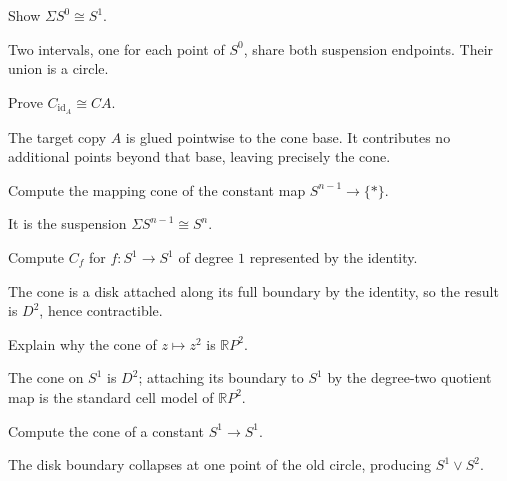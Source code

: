 \begin{problem}[Suspension of \(S^0\)]\label{prob:viii07-03}
Show \(\Sigma S^0\cong S^1\).
\end{problem}
\begin{solution}
Two intervals, one for each point of \(S^0\), share both suspension endpoints.  Their union is a circle.
\end{solution}

\begin{problem}\label{prob:viii07-04}
Prove \(C_{\operatorname{id}_A}\cong CA\).
\end{problem}
\begin{solution}
The target copy \(A\) is glued pointwise to the cone base.  It contributes no additional points beyond that base, leaving precisely the cone.
\end{solution}

\begin{problem}\label{prob:viii07-05}
Compute the mapping cone of the constant map \(S^{n-1}\to\{*\}\).
\end{problem}
\begin{solution}
It is the suspension \(\Sigma S^{n-1}\cong S^n\).
\end{solution}

\begin{problem}\label{prob:viii07-06}
Compute \(C_f\) for \(f:S^1\to S^1\) of degree \(1\) represented by the identity.
\end{problem}
\begin{solution}
The cone is a disk attached along its full boundary by the identity, so the result is \(D^2\), hence contractible.
\end{solution}

\begin{problem}\label{prob:viii07-07}
Explain why the cone of \(z\mapsto z^2\) is \(\mathbb RP^2\).
\end{problem}
\begin{solution}
The cone on \(S^1\) is \(D^2\); attaching its boundary to \(S^1\) by the degree-two quotient map is the standard cell model of \(\mathbb RP^2\).
\end{solution}

\begin{problem}\label{prob:viii07-08}
Compute the cone of a constant \(S^1\to S^1\).
\end{problem}
\begin{solution}
The disk boundary collapses at one point of the old circle, producing \(S^1\vee S^2\).
\end{solution}

